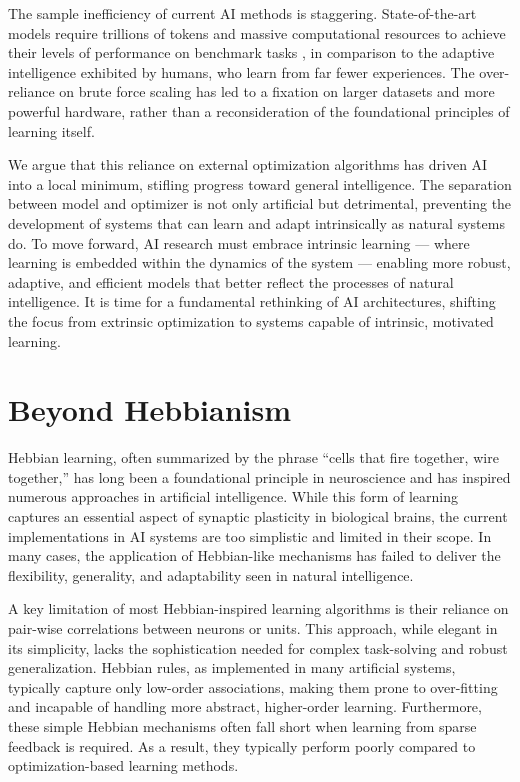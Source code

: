 \documentclass{article}
\begin{document}
The sample inefficiency of current AI methods is
staggering. State-of-the-art models require trillions of tokens and
massive computational resources to achieve their levels of performance on
benchmark tasks \cite{openai2024gpt4technicalreport},
in comparison to the adaptive intelligence exhibited by humans,
who learn from far fewer experiences. The over-reliance on brute force scaling has
led to a fixation on larger datasets and more powerful hardware, rather
than a reconsideration of the foundational principles of learning itself.

We argue that this reliance on external optimization algorithms has
driven AI into a local minimum, stifling progress toward general
intelligence. The separation between model and optimizer is not only
artificial but detrimental, preventing the development of systems that can
learn and adapt intrinsically as natural systems do. To move
forward, AI research must embrace intrinsic learning --- where learning
is embedded within the dynamics of the system --- enabling more robust,
adaptive, and efficient models that better reflect the processes of
natural intelligence. It is time for a fundamental rethinking
of AI architectures, shifting the focus from extrinsic optimization to
systems capable of intrinsic, motivated learning.


\section{Beyond Hebbianism}

Hebbian learning, often summarized by the phrase ``cells that fire
together, wire together,'' has long been a foundational principle
in neuroscience and has inspired numerous approaches in artificial
intelligence. While this form of learning captures an essential aspect of
synaptic plasticity in biological brains, the current implementations in
AI systems are too simplistic and limited in their scope. In many cases,
the application of Hebbian-like mechanisms has failed to deliver the
flexibility, generality, and adaptability seen in natural intelligence.

A key limitation of most Hebbian-inspired learning algorithms is
their reliance on pair-wise correlations between neurons or
units. This approach, while elegant in its simplicity,
lacks the sophistication needed for complex task-solving and robust
generalization. Hebbian rules, as implemented in many artificial systems,
typically capture only low-order associations, making them prone
to over-fitting and incapable of handling more abstract, higher-order
learning. Furthermore, these simple Hebbian mechanisms often fall
short when learning from sparse feedback is required.
As a result, they typically perform poorly compared to
optimization-based learning methods.
\end{document}
